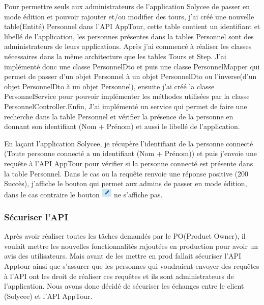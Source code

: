 \documentclass[12pt]{article}
\begin{document}
Pour permettre seuls aux administrateurs de l'application Solycee de passer en mode édition  et pouvoir rajouter et/ou modifier des tours, j'ai créé une nouvelle table(Entité) Personnel dans l'API AppTour, cette table contient un identifiant et libellé de l'application, les personnes présentes dans la tables Personnel sont des administrateurs de leurs applications. Après j'ai commencé à réaliser les classes nécessaires dans la même architecture que les tables Tours et Step. J'ai implémenté donc une classe PersonnelDto et puis une classe PersonnelMapper qui permet de passer d'un objet Personnel à un objet PersonnelDto ou l'inverse(d'un objet PersonnelDto à un objet Personnel), ensuite j'ai créé la classe PersonnelService pour pouvoir implémenter les méthodes utilisées par la classe PersonnelController.Enfin, J'ai implémenté un service qui permet de faire une recherche dans la table Personnel et vérifier la présence de la personne en donnant son identifiant (Nom + Prénom) et aussi le libellé de l'application. 


En laçant l'application Solycee, je récupère l'identifiant de la personne connecté (Toute personne connecté a un identifiant (Nom + Prénom)) et puis j’envoie une requête à l'API AppTour pour vérifier si la personne connecté est présente dans la table Personnel. Dans le cas ou la requête renvoie une réponse positive (200 Succès), j'affiche le bouton qui permet aux admins de passer en mode édition, dans le cas contraire le bouton \includegraphics[width=5mm,scale=0.5]{diagrammes/Bouton_modeEdition.png} ne s'affiche pas. 



\subsubsection{Sécuriser l'API}


Après avoir réaliser toutes les tâches demandés par le PO(Product Owner), il voulait mettre les nouvelles fonctionnalités rajoutées en production pour avoir un avis des utilisateurs. Mais avant de les mettre en prod fallait sécuriser l'API Apptour ainsi que s'assurer que les personnes qui voudraient envoyer des requêtes à l'API ont les droit de réaliser ces requêtes et ils sont administrateurs de l'application. Nous avons donc décidé de sécuriser les échanges entre le client (Solycee) et l'API AppTour. 
\end{document}
